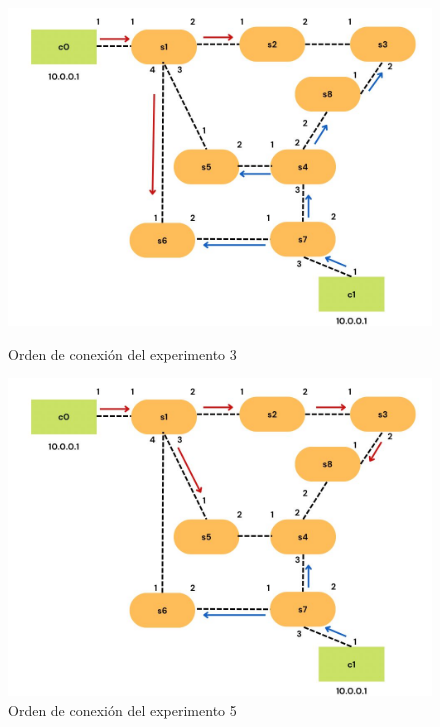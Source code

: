\documentclass[a4paper, 12pt]{book}
\begin{document}
\begin{figure}[H]
 		\begin{minipage}[b]{0.35\textwidth}
 			\centering
 			\includegraphics[width=\textwidth]{img/escenario1_2c_3}
 			\caption{Orden de conexión del experimento 3}
 		\end{minipage}
 		\hfill
 		\begin{minipage}[b]{0.35\textwidth}
 			\centering
 			\includegraphics[width=\textwidth]{img/escenario1_2c_4}
 			\caption{Orden de conexión del experimento 5}
 		\end{minipage}
 		
 		\vspace{10pt} %
 		

\end{figure}
\end{document}
